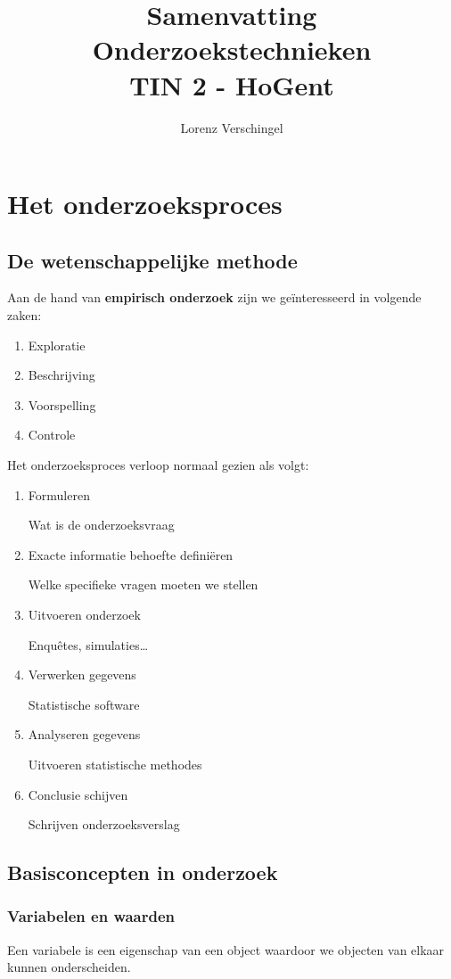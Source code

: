 \documentclass[a4paper,12pt]{article}
\title{Samenvatting Onderzoekstechnieken \\ \large TIN 2 - HoGent}
\author{Lorenz Verschingel}
\begin{document}
\maketitle
\section{Het onderzoeksproces}
\subsection{De wetenschappelijke methode}
Aan de hand van \textbf{empirisch onderzoek} zijn we geïnteresseerd in volgende zaken:

\begin{enumerate}
\item Exploratie
\item Beschrijving
\item Voorspelling
\item Controle
\end{enumerate}

Het onderzoeksproces verloop normaal gezien als volgt:

\begin{enumerate}
\item Formuleren

Wat is de onderzoeksvraag
\item Exacte informatie behoefte definiëren

Welke specifieke vragen moeten we stellen
\item Uitvoeren onderzoek

Enquêtes, simulaties\dots
\item Verwerken gegevens

Statistische software
\item Analyseren gegevens

Uitvoeren statistische methodes
\item Conclusie schijven

Schrijven onderzoeksverslag
\end{enumerate}

\subsection{Basisconcepten in onderzoek}
\subsubsection{Variabelen en waarden}
Een variabele is een eigenschap van een object waardoor we objecten van elkaar kunnen onderscheiden.
\end{document}
